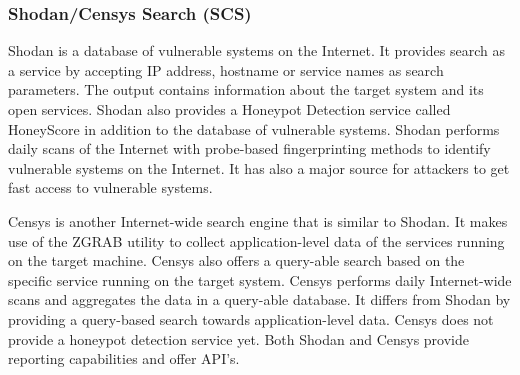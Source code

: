 \subsubsection{Shodan/Censys Search (SCS)}
Shodan is a database of vulnerable systems on the Internet. It provides search as a service by accepting IP address, hostname or service names as search parameters. The output contains information about the target system and its open services. Shodan also provides a Honeypot Detection service called HoneyScore \cite{SHODAN} in addition to the database of vulnerable systems. Shodan performs daily scans of the Internet with probe-based fingerprinting methods to identify vulnerable systems on the Internet. It has also a major source for attackers to get fast access to vulnerable systems.

Censys is another Internet-wide search engine that is similar to Shodan. It makes use of the ZGRAB utility to collect application-level data of the services running on the target machine. Censys also offers a query-able search based on the specific service running on the target system. Censys performs daily Internet-wide scans and aggregates the data in a query-able database. It differs from Shodan by providing a query-based search towards application-level data. Censys does not provide a honeypot detection service yet. Both Shodan and Censys provide reporting capabilities and offer API's. 

